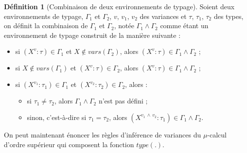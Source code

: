 \documentclass{rapport}
\theoremstyle{plain}
\theoremstyle{remark}
\theoremstyle{definition}
\newtheorem{dfn}{Définition}
\begin{document}
\begin{dfn} [Combinaison de deux environnements de typage] Soient deux environnements de typage, $\Gamma_1$ et $\Gamma_2$, $v$, $v_1$, $v_2$ des variances et $\tau$, $\tau_1$, $\tau_2$ des types, on définit la combinaison de $\Gamma_1$ et $\Gamma_2$, notée ${\Gamma_1 \wedge \Gamma_2}$ comme étant un environnement de typage construit de la manière suivante : 
\begin{itemize}
	\item si $(X^v : \tau) \in \Gamma_1$ et $X \notin vars(\Gamma_2)$, alors $(X^v : \tau) \in {\Gamma_1 \wedge \Gamma_2}$ ;
	\item si $X \notin vars(\Gamma_1)$ et $(X^v : \tau) \in \Gamma_2$, alors $(X^v : \tau) \in {\Gamma_1 \wedge \Gamma_2}$ ;
	\item si $(X^{v_1} : \tau_1) \in \Gamma_1$ et $(X^{v_2} : \tau_2) \in \Gamma_2$, alors : 
	\begin{itemize}
		\item si $\tau_1 \neq \tau_2$, alors ${\Gamma_1 \wedge \Gamma_2}$ n'est pas défini ;
		\item sinon, c'est-à-dire si $\tau_1 = \tau_2$, alors $(X^{v_1 \, \wedge \, v_2} : \tau_1) \in {\Gamma_1 \wedge \Gamma_2}$.
	\end{itemize}
\end{itemize}
\end{dfn}

On peut maintenant énoncer les règles d'inférence de variances du $\mu$-calcul d'ordre supérieur qui composent la fonction $type(.)$.
\end{document}
